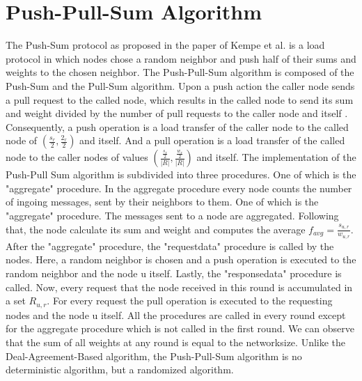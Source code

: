 \section{Push-Pull-Sum Algorithm}
The Push-Sum protocol as proposed in the paper of Kempe et al.\cite{kempe2003gossipbasedComp} is a load protocol in which nodes chose a random neighbor and push half of their sums and weights to the chosen neighbor. The Push-Pull-Sum algorithm is composed of the Push-Sum and the Pull-Sum algorithm. Upon a push action the caller node sends a pull request to the called node, which results in the called node to send its sum and weight divided by the number of pull requests to the caller node and itself \cite{nugroho2023PushPullSumDataAg}. Consequently, a push operation is a load transfer of the caller node to the called node of $\left(\frac{s_{r}}{2}, \frac{2_{r}}{2}\right)$ and itself. And a pull operation is a load transfer of the called node to the caller nodes of values $\left(\frac{\frac{s_{r}}{2}}{|R|}, \frac{\frac{w_{r}}{2}}{|R|}\right)$ and itself. The implementation of the Push-Pull Sum algorithm is subdivided into three procedures. One of which is the "aggregate" procedure. In the aggregate procedure every node counts the number of ingoing messages, sent by their neighbors to them. One of which is the "aggregate" procedure. The messages sent to a node are aggregated. Following that, the node calculate its sum and weight and computes the average $f_{avg} = \frac{s_{u, r}}{w_{u, r}}$. After the "aggregate" procedure, the "requestdata" procedure is called by the nodes. Here, a random neighbor is chosen and a push operation is executed to the random neighbor and the node u itself. Lastly, the "responsedata" procedure is called. Now, every request that the node received in this round is accumulated in a set $R_{u, r}$. For every request the pull operation is executed to the requesting nodes and the node u itself. All the procedures are called in every round except for the aggregate procedure which is not called in the first round. We can observe that the sum of all weights at any round is equal to the networksize. Unlike the Deal-Agreement-Based algorithm, the Push-Pull-Sum algorithm is no deterministic algorithm, but a randomized algorithm. 